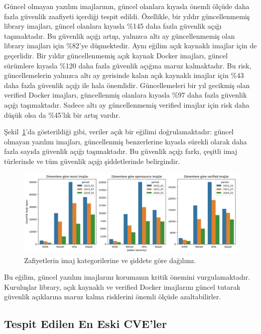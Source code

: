 Güncel olmayan yazılım imajlarının, güncel olanlara kıyasla önemli ölçüde daha fazla güvenlik zaafiyeti içerdiği tespit edildi. Özellikle, bir yıldır güncellenmemiş library imajları, güncel olanlara kıyasla \%145 daha fazla güvenlik açığı taşımaktadır. Bu güvenlik açığı artışı, yalnızca altı ay güncellenmemiş olan library imajları için \%82'ye düşmektedir. Aynı eğilim açık kaynaklı imajlar için de geçerlidir. Bir yıldır güncellenmemiş açık kaynak Docker imajları, güncel sürümlere kıyasla \%120 daha fazla güvenlik açığına maruz kalmaktadır. Bu risk, güncellemelerin yalnızca altı ay gerisinde kalan açık kaynaklı imajlar için \%43 daha fazla güvenlik açığı ile hala önemlidir. Güncellemeleri bir yıl gecikmiş olan verified Docker imajları, güncellenmiş olanlara kıyasla \%97 daha fazla güvenlik açığı taşımaktadır. Sadece altı ay güncellenmemiş verified imajlar için risk daha düşük olsa da \%45'lık bir artış vardır.

Şekil~\ref{fig:image-type-severity}'da gösterildiği gibi, veriler açık bir eğilimi doğrulamaktadır: güncel olmayan yazılım imajları, güncellenmiş benzerlerine kıyasla sürekli olarak daha fazla sayıda güvenlik açığı taşımaktadır. Bu güvenlik açığı farkı, çeşitli imaj türlerinde ve tüm güvenlik açığı şiddetlerinde belirgindir.

\begin{figure}[!htbp]
    \centering
    \includegraphics[width=1\linewidth]{images/s2/image-type-severity.png}
    \caption{Zafiyetlerin imaj kategorilerine ve şiddete göre dağılımı.}\label{fig:image-type-severity}
\end{figure}

Bu eğilim, güncel yazılım imajlarını korumanın kritik önemini vurgulamaktadır. Kuruluşlar library, açık kaynaklı ve verified Docker imajlarını güncel tutarak güvenlik açıklarına maruz kalma risklerini önemli ölçüde azaltabilirler.

\subsection{Tespit Edilen En Eski CVE'ler}\label{subsec:detected-oldest-cves}


